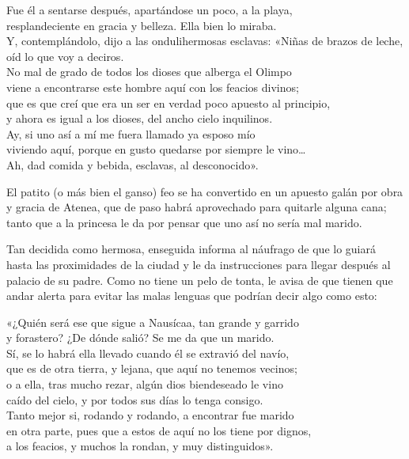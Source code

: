 \begin{versocita}
Fue él a sentarse después, apartándose un poco, a la playa,\\
resplandeciente en gracia y belleza. Ella bien lo miraba.\\
Y, contemplándolo, dijo a las ondulihermosas esclavas:
\stanzabreak
«Niñas de brazos de leche, oíd lo que voy a deciros.\\
No mal de grado de todos los dioses que alberga el Olimpo\\
viene a encontrarse este hombre aquí con los feacios divinos;\\
que es que creí que era un ser en verdad poco apuesto al principio,\\
y ahora es igual a los dioses, del ancho cielo inquilinos.\\
Ay, si uno así a mí me fuera llamado ya esposo mío\\
viviendo aquí, porque en gusto quedarse por siempre le vino…\\
Ah, dad comida y bebida, esclavas, al desconocido».
\end{versocita}

El patito (o más bien el ganso) feo se ha convertido en un apuesto galán por obra y gracia de Atenea, que de paso habrá aprovechado para quitarle alguna cana; tanto que a la princesa le da por pensar que uno así no sería mal marido.

Tan decidida como hermosa, enseguida informa al náufrago de que lo guiará hasta las proximidades de la ciudad y le da instrucciones para llegar después al palacio de su padre. Como no tiene un pelo de tonta, le avisa de que tienen que andar alerta para evitar las malas lenguas que podrían decir algo como esto:

\begin{versocita}
«¿Quién será ese que sigue a Nausícaa, tan grande y garrido\\
y forastero? ¿De dónde salió? Se me da que un marido.\\
Sí, se lo habrá ella llevado cuando él se extravió del navío,\\
que es de otra tierra, y lejana, que aquí no tenemos vecinos;\\
o a ella, tras mucho rezar, algún dios biendeseado le vino\\
caído del cielo, y por todos sus días lo tenga consigo.\\
Tanto mejor si, rodando y rodando, a encontrar fue marido\\
en otra parte, pues que a estos de aquí no los tiene por dignos,\\
a los feacios, y muchos la rondan, y muy distinguidos».
\end{versocita}

